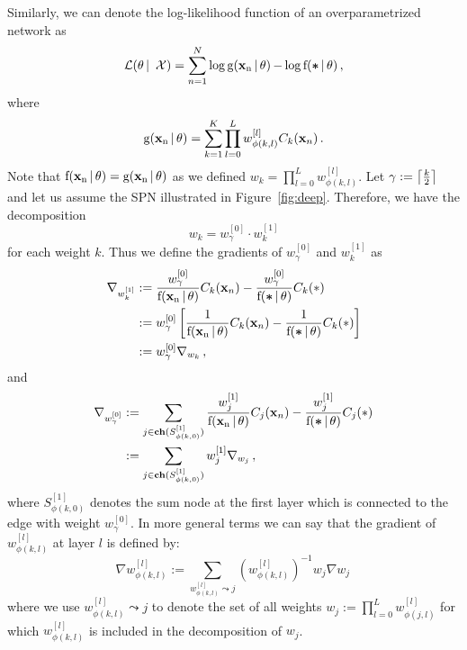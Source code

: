\documentclass{article}
\DeclarePairedDelimiter\ceil{\lceil}{\rceil}
\DeclareMathOperator*{\f}{f(\xn \,|\, \theta)}
\DeclareMathOperator*{\fz}{f(\bm \ast \,|\, \theta)}
\DeclareMathOperator*{\fdeep}{g(\xn \,|\, \theta)}
\newcommand{\wa}{w^{[0]}_{\gamma}}
\newcommand{\wb}{w^{[1]}_{k}}
\begin{document}
Similarly, we can denote the log-likelihood function of an overparametrized network as
\begin{equation} \label{eq:deepLLH}
\mathcal{L}(\theta\, | \, \mathcal{X}) = \sum_{n=1}^N \log \fdeep - \log \fz \, ,
\end{equation}
where
\[
\fdeep = \sum_{k=1}^K \prod_{l=0}^L w^{[l]}_{\phi(k, l)} C_k(\xn) \, .
\]
Note that $\f = \fdeep$ as we defined $w_k = \prod_{l=0}^L w^{[l]}_{\phi(k, l)}$.
Let $\gamma := \ceil*{\frac{k}{2}}$ and let us assume the SPN illustrated in Figure~\ref{fig:deep}.
Therefore, we have the decomposition 
\[
w_k = \wa \cdot \wb
\]
for each weight $k$. Thus we define the gradients of $\wa$ and $\wb$ as
\begin{align}
  \begin{aligned}
  \nabla_{\wb} &:= \frac{\wa}{\f} C_k(\xn) - \frac{\wa}{\fz} C_k(\ast) \\
  &:= \wa \left[ \frac{1}{\f} C_k(\xn) - \frac{1}{\fz} C_k(\ast) \right] \\
  &:= \wa \nabla_{w_k} \, ,
  \end{aligned}
\end{align}
and
\begin{align}
  \begin{aligned}
  \nabla_{\wa} &:= \sum_{j \in \ch(S^{[1]}_{\phi(k,0)})} \frac{w^{[1]}_j}{\f} C_j(\xn) - \frac{w^{[1]}_j}{\fz} C_j(\ast) \\
  &:= \sum_{j \in \ch(S^{[1]}_{\phi(k,0)})} w^{[1]}_j \nabla_{w_j} \, ,
\end{aligned}
\end{align}
where $S^{[1]}_{\phi(k,0)}$ denotes the sum node at the first layer which is connected to the edge with weight $\wa$.
In more general terms we can say that the gradient of $w^{[l]}_{\phi(k, l)}$ at layer $l$ is defined by:
\begin{equation} \label{eq:generalGradients}
  \nabla w^{[l]}_{\phi(k, l)} := \sum_{w^{[l]}_{\phi(k, l)} \leadsto j} (w^{[l]}_{\phi(k, l)})^{-1} w_j \nabla{w_j} \,
\end{equation}
where we use $w^{[l]}_{\phi(k, l)} \leadsto j$ to denote the set of all weights $w_j:= \prod_{l=0}^L w^{[l]}_{\phi(j, l)}$ for which $w^{[l]}_{\phi(k, l)}$ is included in the decomposition of $w_j$.
\end{document}
